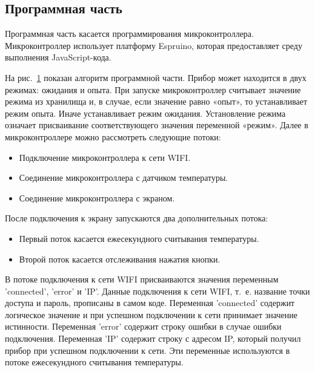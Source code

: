 \documentclass[12pt]{extarticle}
\begin{document}
\subsection{Программная часть}\label{Программная часть}


Программная часть касается программирования микроконтроллера. Микроконтроллер использует платформу Espruino, которая предоставляет среду выполнения JavaScript-кода.

%	


\begin{figure}[p]
    \centering
	
	\label{Алгоритм прибора}
\end{figure}

На рис.~\ref{Алгоритм прибора} показан алгоритм программной части. Прибор может находится в двух режимах: ожидания и опыта. %
При запуске микроконтроллер считывает значение режима из хранилища и, в случае, если значение равно «опыт», то устанавливает режим опыта. Иначе устанавливает режим ожидания. Установление режима означает присваивание  соответствующего значения переменной «режим». Далее в микроконтроллере можно рассмотреть следующие потоки:
\begin{itemize}
	\item Подключение микроконтроллера к сети WIFI.
	\item Соединение микроконтроллера с датчиком температуры.
	\item Соединение микроконтроллера с экраном.
\end{itemize}
После подключения к экрану запускаются два дополнительных потока: 
\begin{itemize}
	\item Первый поток касается ежесекундного считывания температуры.
	\item Второй поток касается отслеживания нажатия кнопки.
\end{itemize}



В потоке подключения к сети WIFI присваиваются значения переменным 'con\-nected', 'error' и 'IP'. Данные подключения к сети WIFI, т.~е. название точки доступа и пароль, прописаны в самом коде. Переменная 'connected' содержит логическое значение и при успешном подключении к сети принимает значение истинности. Переменная 'error' содержит строку ошибки в случае ошибки подключения. Переменная 'IP' содержит строку с адресом IP, который получил прибор при успешном подключении к сети. Эти переменные используются в потоке ежесекундного считывания температуры. 
\end{document}
